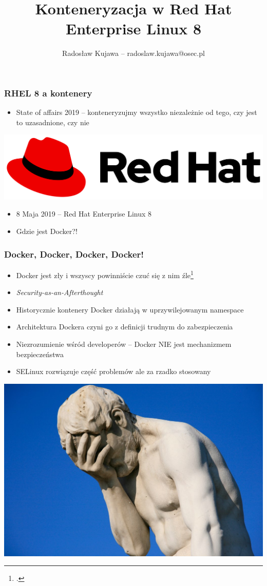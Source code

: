 \documentclass[dvipsnames,table]{beamer}
\title{Konteneryzacja w Red Hat Enterprise Linux 8}
\author{Radosław Kujawa -- radoslaw.kujawa@osec.pl}
\institute{OSEC}
\begin{document}
\begin{frame}
	\titlepage
\end{frame}

\begin{frame}
\frametitle{RHEL 8 a kontenery}
	\begin{itemize}
		\item State of affairs 2019 -- konteneryzujmy wszystko niezależnie od tego, czy jest to uzasadnione, czy nie
	\end{itemize}
	\begin{center}
		\includegraphics[scale=0.1]{img-rhlogo.png}
	\end{center}
	\begin{itemize}
		\item 8 Maja 2019 -- Red Hat Enterprise Linux 8
		\item Gdzie jest Docker?!
	\end{itemize}
\end{frame}

\begin{frame}
	\frametitle{Docker, Docker, Docker, Docker!}
	\begin{itemize}
		\item Docker jest zły i wszyscy powinniście czuć się z nim źle\footcite{Barcamp2016}
		\item {\it Security-as-an-Afterthought}
		\item Historycznie kontenery Docker działają w uprzywilejowanym namespace
		\item Architektura Dockera czyni go z definicji trudnym do zabezpieczenia
		\item Niezrozumienie wśród developerów -- Docker NIE jest mechanizmem bezpieczeństwa
		\item SELinux rozwiązuje część problemów ale za rzadko stosowany
	\end{itemize}
	\begin{center}
		\includegraphics[scale=0.09]{img-facepalm.jpg}
	\end{center}
\end{frame}
\end{document}
